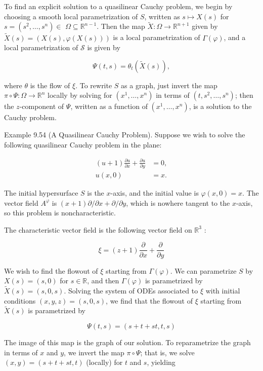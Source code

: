 \documentclass[10pt]{article}
\begin{document}
To find an explicit solution to a quasilinear Cauchy problem, we begin by choosing a smooth local parametrization of $S$, written as $s \mapsto X(s)$ for $s=\left(s^{2}, \ldots, s^{n}\right) \in$ $\Omega \subseteq \mathbb{R}^{n-1}$. Then the map $\tilde{X}: \Omega \rightarrow \mathbb{R}^{n+1}$ given by $\tilde{X}(s)=(X(s), \varphi(X(s)))$ is a local parametrization of $\Gamma(\varphi)$, and a local parametrization of $\mathcal{S}$ is given by

$$
\Psi(t, s)=\theta_{t}(\tilde{X}(s)),
$$

where $\theta$ is the flow of $\xi$. To rewrite $S$ as a graph, just invert the map $\pi \circ \Psi: \Omega \rightarrow \mathbb{R}^{n}$ locally by solving for $\left(x^{1}, \ldots, x^{n}\right)$ in terms of $\left(t, s^{2}, \ldots, s^{n}\right)$; then the $z$-component of $\Psi$, written as a function of $\left(x^{1}, \ldots, x^{n}\right)$, is a solution to the Cauchy problem.

Example 9.54 (A Quasilinear Cauchy Problem). Suppose we wish to solve the following quasilinear Cauchy problem in the plane:

$$
\begin{aligned}
(u+1) \frac{\partial u}{\partial x}+\frac{\partial u}{\partial y} & =0, \\
u(x, 0) & =x .
\end{aligned}
$$

The initial hypersurface $S$ is the $x$-axis, and the initial value is $\varphi(x, 0)=x$. The vector field $A^{\varphi}$ is $(x+1) \partial / \partial x+\partial / \partial y$, which is nowhere tangent to the $x$-axis, so this problem is noncharacteristic.

The characteristic vector field is the following vector field on $\mathbb{R}^{3}$ :

$$
\xi=(z+1) \frac{\partial}{\partial x}+\frac{\partial}{\partial y}
$$

We wish to find the flowout of $\xi$ starting from $\Gamma(\varphi)$. We can parametrize $S$ by $X(s)=(s, 0)$ for $s \in \mathbb{R}$, and then $\Gamma(\varphi)$ is parametrized by $\widetilde{X}(s)=(s, 0, s)$. Solving the system of ODEs associated to $\xi$ with initial conditions $(x, y, z)=(s, 0, s)$, we find that the flowout of $\xi$ starting from $\tilde{X}(s)$ is parametrized by

$$
\Psi(t, s)=(s+t+s t, t, s)
$$

The image of this map is the graph of our solution. To reparametrize the graph in terms of $x$ and $y$, we invert the map $\pi \circ \Psi$; that is, we solve $(x, y)=(s+t+s t, t)$ (locally) for $t$ and $s$, yielding
\end{document}
